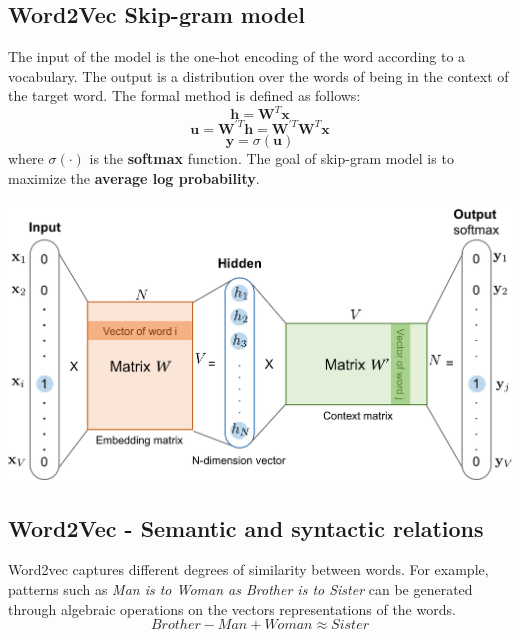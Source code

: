 \subsection{Word2Vec Skip-gram model}
The input of the model is the one-hot encoding of the word according to a vocabulary.
The output is a distribution over the words of being in the context of the target word. The formal method is defined as follows:
\[\textbf{h} = \textbf{W}^{T}\textbf{x}\]
\[\textbf{u} = \textbf{W}^{'T}\textbf{h} = \textbf{W}^{'T}\textbf{W}^{T}\textbf{x}\]
\[\textbf{y} = \sigma(\textbf{u})\]
where $\sigma(\cdot)$ is the \textbf{softmax} function.\newline\newline
The goal of skip-gram model is to maximize the \textbf{average log probability}.
\begin{center}
    \includegraphics[scale = 0.3]{images/skip-gram.png}
\end{center}

\subsection{Word2Vec - Semantic and syntactic relations}
Word2vec captures different degrees of similarity between words. For example, patterns such as \textit{Man is to Woman as Brother is to Sister} can be generated through algebraic operations on the vectors representations of the words.
\[Brother - Man + Woman \approx Sister\]

